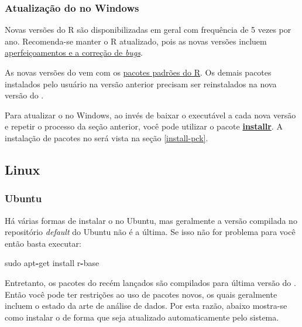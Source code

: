 \documentclass[]{book}
\newenvironment{Shaded}{\begin{snugshade}}{\end{snugshade}}
\newcommand{\OperatorTok}[1]{\textcolor[rgb]{0.81,0.36,0.00}{\textbf{#1}}}
\newcommand{\NormalTok}[1]{#1}
\begin{document}
\subsubsection{\texorpdfstring{Atualização do no
Windows}{Atualização do  no Windows}}\label{atualizacao-do-no-windows}

Novas versões do R são disponibilizadas em geral com frequência de 5
vezes por ano. Recomenda-se manter o R atualizado, pois as novas versões
incluem
\href{https://cran.r-project.org/bin/windows/base/NEWS.R-3.4.4.html}{aperfeiçoamentos
e a correção de \emph{bugs}}.

As novas versões do vem com os
\href{https://cran.r-project.org/doc/manuals/R-FAQ.html\#Which-add_002don-packages-exist-for-R_003f}{pacotes
padrões do R}. Os demais pacotes instalados pelo usuário na versão
anterior precisam ser reinstalados na nova versão do .

Para atualizar o no Windows, ao invés de baixar o executável a cada nova
versão e repetir o processo da seção anterior, você pode utilizar o
pacote
\href{https://cran.r-project.org/web/packages/installr/index.html}{\textbf{installr}}.
A instalação de pacotes no será vista na seção \ref{install-pck}.

\subsection{Linux}\label{linux}

\subsubsection{Ubuntu}\label{ubuntu}

Há várias formas de instalar o no Ubuntu, mas geralmente a versão
compilada no repositório \emph{default} do Ubuntu não é a última. Se
isso não for problema para você então basta executar:

\begin{Shaded}
\begin{Highlighting}[]
\NormalTok{sudo apt}\OperatorTok{-}\NormalTok{get install r}\OperatorTok{-}\NormalTok{base}
\end{Highlighting}
\end{Shaded}

Entretanto, os pacotes do recém lançados são compilados para última
versão do . Então você pode ter restrições ao uso de pacotes novos, os
quais geralmente incluem o estado da arte de análise de dados. Por esta
razão, abaixo mostra-se como instalar o de forma que seja atualizado
automaticamente pelo sistema.
\end{document}

